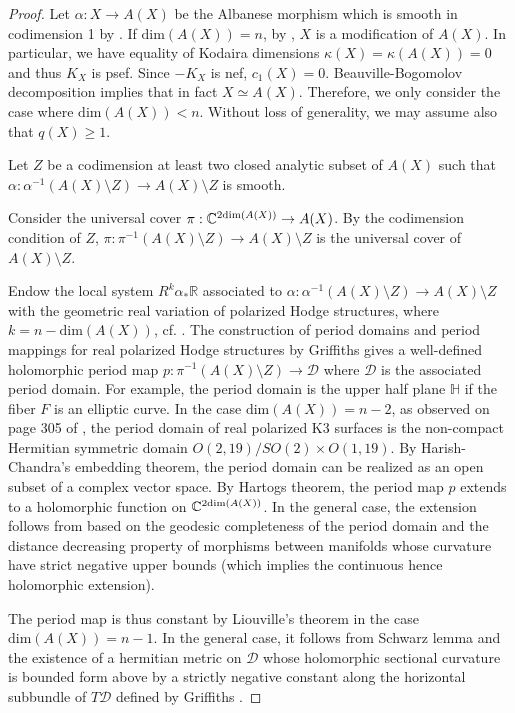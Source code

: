 \documentclass[a4, 12pt]{amsart}
\numberwithin{equation}{section}
\theoremstyle{definition}
\def\R{\mathbb{R}}
\def \dim{\mathrm{dim}}
\begin{document}
\begin{proof}
Let $\alpha: X \to A(X)$ be the Albanese morphism which is smooth in codimension 1 by \cite{Cao13}.
If $\dim (A(X))=n$, by \cite{Cao13}, $X$ is a modification of $A(X)$.
In particular, we have equality of Kodaira dimensions $\kappa(X)=\kappa(A(X))=0$ and thus $K_X$ is psef.
Since $-K_X$ is nef, $c_1(X)=0$.
Beauville-Bogomolov decomposition implies that in fact $X \simeq A(X)$.
Therefore, we only consider the case where $\dim(A(X))<n$.
Without loss of generality, we may assume also that $q(X) \geq 1$.

Let $Z$ be a codimension at least two closed analytic subset of $A(X)$ such that $\alpha: \alpha^{-1}(A(X) \setminus Z) \to A(X) \setminus Z$ is smooth.

Consider the universal cover $\pi: \C^{2\dim(A(X))} \to A(X)$.
By the codimension condition of $Z$,
$\pi: \pi^{-1}(A(X) \setminus Z) \to A(X) \setminus Z$ is the universal cover of $A(X) \setminus Z$.

Endow the local system $R^k\alpha_*\R$ associated to $\alpha: \alpha^{-1}(A(X) \setminus Z) \to A(X)\setminus Z$ with the geometric real variation of polarized Hodge structures, where $k=n-\dim(A(X))$, cf. \cite{TZ14}.
The construction of period domains and period mappings for real polarized Hodge structures by Griffiths gives a
well-defined holomorphic period map $p: \pi^{-1}(A(X) \setminus Z) \to \mathcal{D}$ where $\mathcal{D}$ is the associated period domain. 
For example, the period domain is the upper half plane $\mathbb{H}$ if the fiber $F$ is an elliptic curve.
In the case $\dim(A(X))=n-2$, as observed on page 305 of \cite{Kob90}, the period domain of real polarized K3 surfaces is the non-compact Hermitian symmetric domain $O(2,19)/SO(2) \times O(1,19)$.
By Harish-Chandra's embedding theorem, the period domain can be realized as an open subset of a complex vector space.
By Hartogs theorem, the period map $p$ extends to a holomorphic function on $\C^{2\dim(A(X))}$.
In the general case, the extension follows from \cite[Corollary 9.5]{GS69} based on the geodesic completeness of the period domain and the distance decreasing property of morphisms between manifolds whose curvature have strict negative upper bounds (which implies the continuous hence holomorphic extension).

The period map is thus constant by Liouville's theorem in the case $\dim(A(X))=n-1$.
In the general case,
it follows from Schwarz lemma \cite[Lemma 3.3]{TZ14} and the existence of a hermitian metric on $\mathcal{D}$ whose holomorphic sectional curvature is bounded form above by a strictly negative constant along the horizontal subbundle of $T \mathcal{D}$ defined by Griffiths \cite{Gri70}.


\end{proof}
\end{document}
